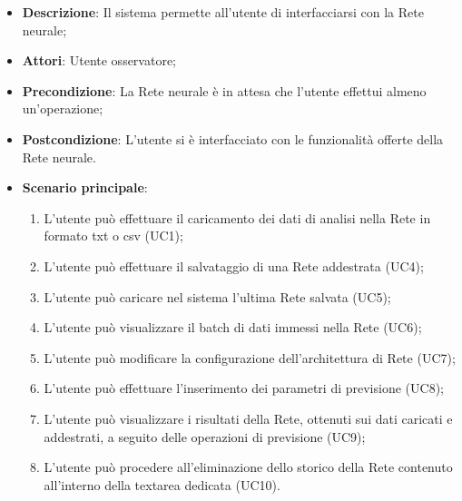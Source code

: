 \begin{itemize}
\item \textbf{Descrizione}: Il sistema permette all'utente di interfacciarsi con la Rete neurale;
\item \textbf{Attori}: Utente osservatore;
\item \textbf{Precondizione}: La Rete neurale \`e in attesa che l'utente effettui almeno un'operazione;
\item \textbf{Postcondizione}: L'utente si \`e interfacciato con le funzionalit\`a offerte della Rete neurale.
\item \textbf{Scenario principale}:
\begin{enumerate}
\item L'utente pu\`o effettuare il caricamento dei dati di analisi nella Rete in formato txt o csv (UC1);
\item L'utente pu\`o effettuare il salvataggio di una Rete addestrata (UC4);
\item L'utente pu\`o caricare nel sistema l'ultima Rete salvata (UC5);
\item L'utente pu\`o visualizzare il batch di dati immessi nella Rete (UC6);
\item L'utente pu\`o modificare la configurazione dell'architettura di Rete (UC7);
\item L'utente pu\`o effettuare  l'inserimento dei parametri di previsione (UC8);
\item L'utente pu\`o visualizzare i risultati della Rete, ottenuti sui dati caricati e addestrati, a seguito delle operazioni di previsione (UC9);
\item L'utente pu\`o procedere all'eliminazione dello storico della Rete contenuto all'interno della textarea dedicata (UC10).

\end{enumerate}
\end{itemize}

